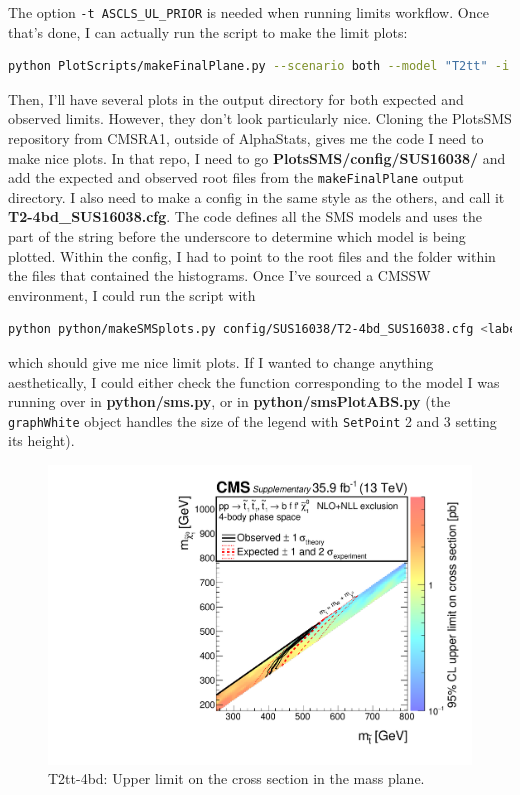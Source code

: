 The option \texttt{-t ASCLS\_UL\_PRIOR} is needed when running limits workflow. Once that's done, I can actually run the script to make the limit plots:

\begin{lstlisting}[belowskip=-0.7cm, language=sh, numbers=none]
python PlotScripts/makeFinalPlane.py --scenario both --model "T2tt" -i $OUTDIR -o <output dir for plots> --mode ul --doubleTranspose --addTheory --remake --remakePickle --smooth
\end{lstlisting}

Then, I'll have several plots in the output directory for both expected and observed limits. However, they don't look particularly nice. Cloning the PlotsSMS repository from CMSRA1, outside of AlphaStats, gives me the code I need to make nice plots. In that repo, I need to go \textbf{PlotsSMS/config/SUS16038/} and add the expected and observed root files from the \texttt{makeFinalPlane} output directory. I also need to make a config in the same style as the others, and call it \textbf{T2-4bd\_SUS16038.cfg}. The code defines all the SMS models and uses the part of the string before the underscore to determine which model is being plotted. Within the config, I had to point to the root files and the folder within the files that contained the histograms. Once I've sourced a CMSSW environment, I could run the script with

\begin{lstlisting}[belowskip=-0.7cm, language=sh, numbers=none]
python python/makeSMSplots.py config/SUS16038/T2-4bd_SUS16038.cfg <label - normally model name>
\end{lstlisting}

which should give me nice limit plots. If I wanted to change anything aesthetically, I could either check the function corresponding to the model I was running over in \textbf{python/sms.py}, or in \textbf{python/smsPlotABS.py} (the \texttt{graphWhite} object handles the size of the legend with \texttt{SetPoint} 2 and 3 setting its height).

\begin{figure}[htbp]
\centering
\includegraphics[width=120mm]{./sec31/T2-4bdXSEC.pdf}
\caption{T2tt-4bd: Upper limit on the cross section in the mass plane.}
\end{figure}

